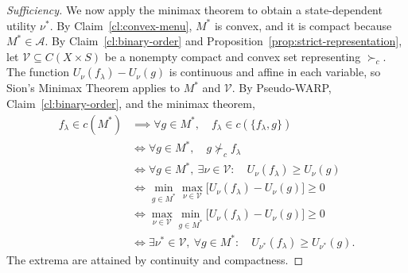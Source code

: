 \documentclass[11pt]{article}
\begin{document}
\begin{proof}[Sufficiency]
We now apply the minimax theorem to obtain a state-dependent utility
$\nu^*$. By Claim~\ref{cl:convex-menu}, $M^*$ is convex, and it is
compact because $M^*\in\mathcal{A}$. By Claim~\ref{cl:binary-order}
and Proposition~\ref{prop:strict-representation}, let
$\mathcal{V}\subseteq C(X\times S)$ be a nonempty compact and convex
set representing $\succ_c$.
The function $U_\nu(f_\lambda)-U_\nu(g)$ is continuous and affine in
each variable, so Sion's Minimax Theorem applies to $M^*$ and
$\mathcal{V}$. By Pseudo-WARP, Claim~\ref{cl:binary-order}, and the
minimax theorem,
\[
\begin{aligned}
 f_\lambda\in c(M^*)
 &\implies \forall g\in M^*,\quad
 f_\lambda\in c(\{f_\lambda,g\})\\
 &\iff \forall g\in M^*,\quad g\not\succ_c f_\lambda\\
 &\iff \forall g\in M^*,\ \exists\nu\in\mathcal{V}:\quad
 U_\nu(f_\lambda)\geq U_\nu(g)\\
 &\iff \min_{g\in M^*}\max_{\nu\in\mathcal{V}}
 \bigl[U_\nu(f_\lambda)-U_\nu(g)\bigr]\geq0\\
 &\iff \max_{\nu\in\mathcal{V}}\min_{g\in M^*}
 \bigl[U_\nu(f_\lambda)-U_\nu(g)\bigr]\geq0\\
 &\iff \exists\nu^*\in\mathcal{V},\ \forall g\in M^*:\quad
 U_{\nu^*}(f_\lambda)\geq U_{\nu^*}(g).
\end{aligned}
\]
The extrema are attained by continuity and compactness.


\end{proof}
\end{document}
